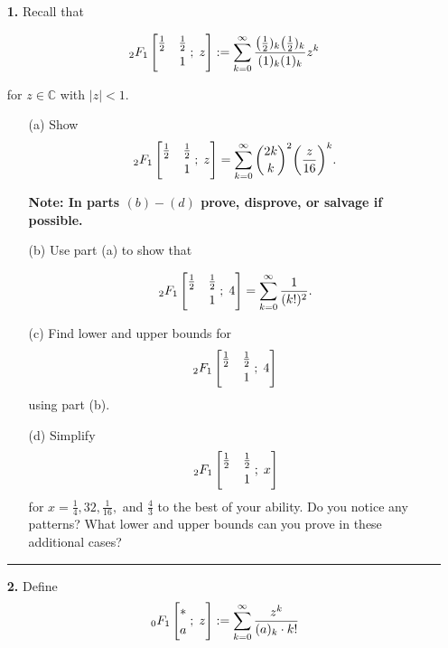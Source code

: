 \documentclass[12pt]{amsart}
\theoremstyle{definition}
\theoremstyle{remark}
\numberwithin{equation}{section}
\def\C{\mathbb C}
\def\C{\mathbb{C}}
\newcommand*\HYPERskip{&}
\newcommand*\pFq{
\begingroup
\catcode`\,\active
\def ,{\HYPERskip}%
\doHyper
}
\def\doHyper#1#2#3#4#5{%
\, _{#1}F_{#2}\left[\begin{matrix}#3 \smallskip \\  #4\end{matrix} \; ; \; #5\right]%
\endgroup
}
\begin{document}
\begin{itemize}

    
    
    
    \item[\textbf{1.}] Recall that 

    $$\pFq{2}{1}{\frac{1}{2}&\frac{1}{2}}{&1}{z}:= \sum_{k=0}^{\infty} \frac{\big(\frac{1}{2})_{k}\big(\frac{1}{2})_{k}}{(1)_{k}(1)_{k}}z^{k}$$

    for $z \in \C$ with $|z| < 1$.
    \\

    \begin{itemize}
        \item[(a)] Show $$\pFq{2}{1}{\frac{1}{2}&\frac{1}{2}}{&1}{z} = \sum_{k=0}^{\infty} \binom{2k}{k}^{2} \bigg(\frac{z}{16} \bigg)^{k}.$$

        \vspace{8mm}

        \textbf{Note: In parts $(b)-(d)$ prove, disprove, or salvage if possible.}

        \vspace{8mm}

        \item[(b)] Use part (a) to show that 

        $$\pFq{2}{1}{\frac{1}{2}&\frac{1}{2}}{&1}{4} = \sum_{k=0}^{\infty} \frac{1}{(k!)^2}.$$

        \vspace{4mm}

        \item[(c)] Find lower and upper bounds for $$\pFq{2}{1}{\frac{1}{2}&\frac{1}{2}}{&1}{4}$$ using part (b).

        \vspace{4mm}

        \item[(d)] Simplify $$\pFq{2}{1}{\frac{1}{2}&\frac{1}{2}}{&1}{x}$$ for $x=\frac{1}{4}, 32, \frac{1}{16},$ and $ \frac{4}{3}$ to the best of your ability. Do you notice any patterns? What lower and upper bounds can you prove in these additional cases?
    \end{itemize}

    \vspace{2mm}

    \hrule{}
    
    \vspace{8mm}

     
    \item[\textbf{2.}] Define $$\pFq{0}{1}{*}{a}{z}:= \sum_{k=0}^{\infty} \frac{z^k}{(a)_{k} \cdot k!}$$


\end{itemize}
\end{document}

